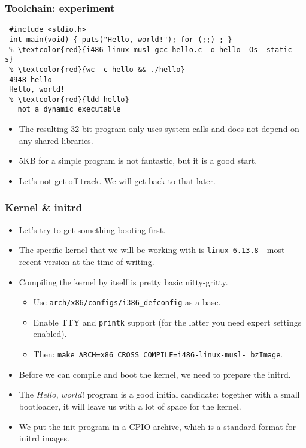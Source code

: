\documentclass{beamer}
\begin{document}
\begin{frame}[t,fragile]
\frametitle{Toolchain: experiment}
\begin{Verbatim}[commandchars=\\\{\}]
 % \textcolor{red}{cat hello.c}
 #include <stdio.h>
 int main(void) { puts("Hello, world!"); for (;;) ; }
 % \textcolor{red}{i486-linux-musl-gcc hello.c -o hello -Os -static -s}
 % \textcolor{red}{wc -c hello && ./hello}
 4948 hello
 Hello, world!
 % \textcolor{red}{ldd hello}
   not a dynamic executable
\end{Verbatim}
\begin{itemize}
  \item The resulting 32-bit program only uses system calls and does not depend on any shared libraries.
  \item 5KB for a simple program is not fantastic, but it is a good start.
  \item Let's not get off track. We will get back to that later.
\end{itemize}
\end{frame}

\begin{frame}[t,fragile]
\frametitle{Kernel \& initrd}
\begin{itemize}
  \item Let's try to get something booting first.
  \item The specific kernel that we will be working with is \verb|linux-6.13.8| - most recent version at the time of writing.
  \item Compiling the kernel by itself is pretty basic nitty-gritty.
  \begin{itemize}
    \item Use \verb|arch/x86/configs/i386_defconfig| as a base.
    \item Enable TTY and \verb|printk| support (for the latter you need expert settings enabled).
    \item Then: \verb|make ARCH=x86 CROSS_COMPILE=i486-linux-musl- bzImage|.
  \end{itemize}
  \item Before we can compile and boot the kernel, we need to prepare the initrd.
  \item The $\textit{Hello, world!}$ program is a good initial candidate: together with a small bootloader, it will leave us with a lot of space for the kernel.
  \item We put the init program in a CPIO archive, which is a standard format for initrd images.
\end{itemize}
\end{frame}
\end{document}
